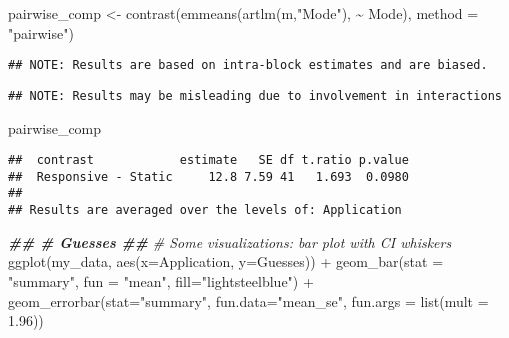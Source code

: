 \documentclass[
]{article}
\newenvironment{Shaded}{\begin{snugshade}}{\end{snugshade}}
\newcommand{\AttributeTok}[1]{\textcolor[rgb]{0.77,0.63,0.00}{#1}}
\newcommand{\CommentTok}[1]{\textcolor[rgb]{0.56,0.35,0.01}{\textit{#1}}}
\newcommand{\DocumentationTok}[1]{\textcolor[rgb]{0.56,0.35,0.01}{\textbf{\textit{#1}}}}
\newcommand{\FloatTok}[1]{\textcolor[rgb]{0.00,0.00,0.81}{#1}}
\newcommand{\FunctionTok}[1]{\textcolor[rgb]{0.00,0.00,0.00}{#1}}
\newcommand{\NormalTok}[1]{#1}
\newcommand{\OtherTok}[1]{\textcolor[rgb]{0.56,0.35,0.01}{#1}}
\newcommand{\SpecialCharTok}[1]{\textcolor[rgb]{0.00,0.00,0.00}{#1}}
\newcommand{\StringTok}[1]{\textcolor[rgb]{0.31,0.60,0.02}{#1}}
\begin{document}
\begin{Shaded}
\begin{Highlighting}[]
\NormalTok{pairwise\_comp }\OtherTok{\textless{}{-}} \FunctionTok{contrast}\NormalTok{(}\FunctionTok{emmeans}\NormalTok{(}\FunctionTok{artlm}\NormalTok{(m,}\StringTok{"Mode"}\NormalTok{), }\SpecialCharTok{\textasciitilde{}}\NormalTok{ Mode), }\AttributeTok{method =} \StringTok{"pairwise"}\NormalTok{)}
\end{Highlighting}
\end{Shaded}

\begin{verbatim}
## NOTE: Results are based on intra-block estimates and are biased.
\end{verbatim}

\begin{verbatim}
## NOTE: Results may be misleading due to involvement in interactions
\end{verbatim}

\begin{Shaded}
\begin{Highlighting}[]
\NormalTok{pairwise\_comp}
\end{Highlighting}
\end{Shaded}

\begin{verbatim}
##  contrast            estimate   SE df t.ratio p.value
##  Responsive - Static     12.8 7.59 41   1.693  0.0980
## 
## Results are averaged over the levels of: Application
\end{verbatim}

\begin{Shaded}
\begin{Highlighting}[]
\DocumentationTok{\#\# \# Guesses \#\#}
\CommentTok{\# Some visualizations: bar plot with CI whiskers }
\FunctionTok{ggplot}\NormalTok{(my\_data, }\FunctionTok{aes}\NormalTok{(}\AttributeTok{x=}\NormalTok{Application, }\AttributeTok{y=}\NormalTok{Guesses)) }\SpecialCharTok{+} \FunctionTok{geom\_bar}\NormalTok{(}\AttributeTok{stat =} \StringTok{"summary"}\NormalTok{, }\AttributeTok{fun =} \StringTok{"mean"}\NormalTok{, }\AttributeTok{fill=}\StringTok{"lightsteelblue"}\NormalTok{) }\SpecialCharTok{+} \FunctionTok{geom\_errorbar}\NormalTok{(}\AttributeTok{stat=}\StringTok{"summary"}\NormalTok{, }\AttributeTok{fun.data=}\StringTok{"mean\_se"}\NormalTok{, }\AttributeTok{fun.args =} \FunctionTok{list}\NormalTok{(}\AttributeTok{mult =} \FloatTok{1.96}\NormalTok{))}
\end{Highlighting}
\end{Shaded}
\end{document}
